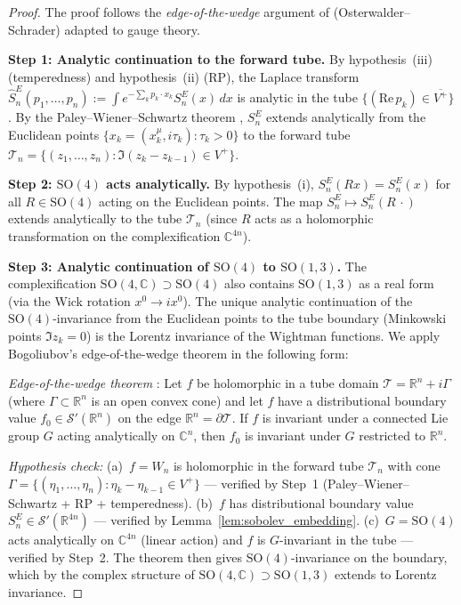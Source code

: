 \documentclass[11pt,a4paper]{amsart}
\theoremstyle{definition}
\newcommand{\R}{\mathbb{R}}
\newcommand{\C}{\mathbb{C}}
\newcommand{\re}{\mathrm{Re}}
\begin{document}
\begin{proof}
The proof follows the \emph{edge-of-the-wedge} argument of
\cite[Thm.~3.3]{OS75} (Osterwalder--Schrader) adapted to gauge theory.

\textbf{Step 1: Analytic continuation to the forward tube.}
By hypothesis~(iii) (temperedness) and hypothesis~(ii) (RP), the Laplace transform
$\hat{S}_n^E(p_1,\ldots,p_n) := \int e^{-\sum_k p_k\cdot x_k} S_n^E(x)\,dx$
is analytic in the tube $\{(\re\,p_k)\in\overline{V^+}\}$.
By the Paley--Wiener--Schwartz theorem \cite[Thm.~IX.11]{ReedSimon4},
$S_n^E$ extends analytically from the Euclidean points
$\{x_k = (x_k^\mu, i\tau_k) : \tau_k > 0\}$ to the forward tube
$\mathcal{T}_n = \{(z_1,\ldots,z_n) : \Im(z_k - z_{k-1}) \in V^+\}$.

\textbf{Step 2: $\mathrm{SO}(4)$ acts analytically.}
By hypothesis~(i), $S_n^E(Rx) = S_n^E(x)$ for all $R\in\mathrm{SO}(4)$
acting on the Euclidean points.  The map $S_n^E \mapsto S_n^E(R\,\cdot)$
extends analytically to the tube $\mathcal{T}_n$ (since $R$ acts as a
holomorphic transformation on the complexification $\C^{4n}$).

\textbf{Step 3: Analytic continuation of $\mathrm{SO}(4)$ to $\mathrm{SO}(1,3)$.}
The complexification $\mathrm{SO}(4,\C) \supset \mathrm{SO}(4)$ also contains
$\mathrm{SO}(1,3)$ as a real form (via the Wick rotation $x^0 \to ix^0$).
The unique analytic continuation of the $\mathrm{SO}(4)$-invariance from the
Euclidean points to the tube boundary (Minkowski points $\Im z_k = 0$)
is the Lorentz invariance of the Wightman functions.
We apply Bogoliubov's edge-of-the-wedge theorem in the following form:

\emph{Edge-of-the-wedge theorem} \cite[Thm.~2.14]{ReedSimon4}:
Let $f$ be holomorphic in a tube domain $\mathcal{T} = \R^n + i\Gamma$
(where $\Gamma \subset \R^n$ is an open convex cone) and let $f$ have a
distributional boundary value $f_0 \in \mathcal{S}'(\R^n)$ on the edge
$\R^n = \partial\mathcal{T}$.
If $f$ is invariant under a connected Lie group $G$ acting analytically
on $\C^n$, then $f_0$ is invariant under $G$ restricted to $\R^n$.

\emph{Hypothesis check:}
(a)~$f = W_n$ is holomorphic in the forward tube $\mathcal{T}_n$ with
cone $\Gamma = \{(\eta_1,\ldots,\eta_n) : \eta_k - \eta_{k-1} \in V^+\}$
--- verified by Step~1 (Paley--Wiener--Schwartz + RP + temperedness).
(b)~$f$ has distributional boundary value $S_n^E \in \mathcal{S}'(\R^{4n})$
--- verified by Lemma~\ref{lem:sobolev_embedding}.
(c)~$G = \mathrm{SO}(4)$ acts analytically on $\C^{4n}$ (linear action)
and $f$ is $G$-invariant in the tube --- verified by Step~2.
The theorem then gives $\mathrm{SO}(4)$-invariance on the boundary, which
by the complex structure of $\mathrm{SO}(4,\C) \supset \mathrm{SO}(1,3)$
extends to Lorentz invariance.


\end{proof}
\end{document}
